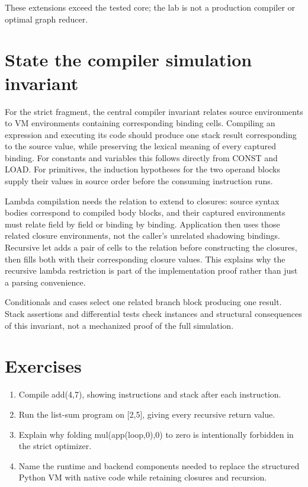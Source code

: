 These extensions exceed the tested core; the lab is not a production compiler or optimal graph reducer.

\section{State the compiler simulation invariant}
\label{sec:ch93-simulation}
For the strict fragment, the central compiler invariant relates source environments to VM environments containing corresponding binding cells.
Compiling an expression and executing its code should produce one stack result corresponding to the source value, while preserving the lexical meaning of every captured binding.
For constants and variables this follows directly from CONST and LOAD.
For primitives, the induction hypotheses for the two operand blocks supply their values in source order before the consuming instruction runs.

Lambda compilation needs the relation to extend to closures: source syntax bodies correspond to compiled body blocks, and their captured environments must relate field by field or binding by binding.
Application then uses those related closure environments, not the caller's unrelated shadowing bindings.
Recursive let adds a pair of cells to the relation before constructing the closures, then fills both with their corresponding closure values.
This explains why the recursive lambda restriction is part of the implementation proof rather than just a parsing convenience.

Conditionals and cases select one related branch block producing one result.
Stack assertions and differential tests check instances and structural consequences of this invariant, not a mechanized proof of the full simulation.

\section{Exercises}
\label{sec:ch93-exercises}
\begin{enumerate}
\item\label{ex:ch93-code} Compile add(4,7), showing instructions and stack after each instruction.
\item\label{ex:ch93-sum} Run the list-sum program on [2,5], giving every recursive return value.
\item\label{ex:ch93-opt} Explain why folding mul(app(loop,0),0) to zero is intentionally forbidden in the strict optimizer.
\item\label{ex:ch93-backend} Name the runtime and backend components needed to replace the structured Python VM with native code while retaining closures and recursion.
\end{enumerate}

